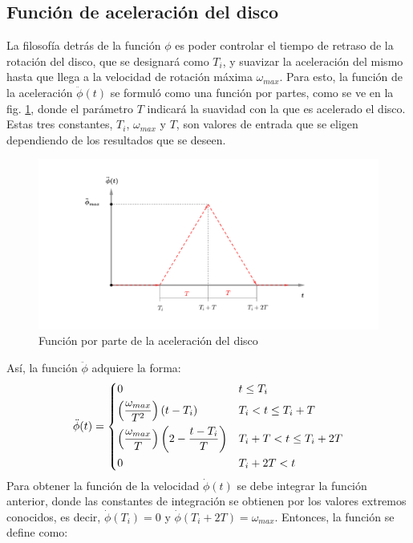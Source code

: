 \subsection{Función de aceleración del disco}
\label{sec:function_angle}
La filosofía detrás de la función $\phi$ es poder controlar el tiempo de retraso de la rotación del disco, que se designará como $T_i$, y suavizar la aceleración del mismo hasta que llega a la velocidad de rotación máxima $\omega_{max}$. Para esto, la función de la aceleración $\ddot{\phi}(t)$ se formuló como una función por partes, como se ve en la fig. \ref{fig:anglepp}, donde el parámetro $T$ indicará la suavidad con la que es acelerado el disco. Estas tres constantes, $T_i$, $\omega_{max}$ y $T$, son valores de entrada que se eligen dependiendo de los resultados que se deseen.
\begin{figure}[h]
\centering
\includegraphics[width=0.9\linewidth, trim={6.5cm 2cm 10cm 2cm},clip]{Imagenes/anglepp_function.pdf}
\caption{Función por parte de la aceleración del disco}
\label{fig:anglepp}
\end{figure}
Así, la función $\ddot{\phi}$ adquiere la forma:
\[ \ddot{\phi}(t) =
\begin{dcases}
	0																		&	t \leq T_i \\
	\left(\frac{\omega_{max}}{T^2}\right)\left(t - T_i\right)				&	T_i < t \leq T_i + T\\
	\left(\frac{\omega_{max}}{T}\right)\left(2 - \frac{t - T_i}{T}\right)	&	T_i + T < t \leq T_i + 2T\\
	0																		&	T_i + 2T < t\\
\end{dcases} 
\]
Para obtener la función de la velocidad $\dot{\phi}(t)$ se debe integrar la función anterior, donde las constantes de integración se obtienen por los valores extremos conocidos, es decir, $\dot{\phi}(T_i) = 0$ y $\dot{\phi}(T_i + 2T) = \omega_{max}$. Entonces, la función se define como:
